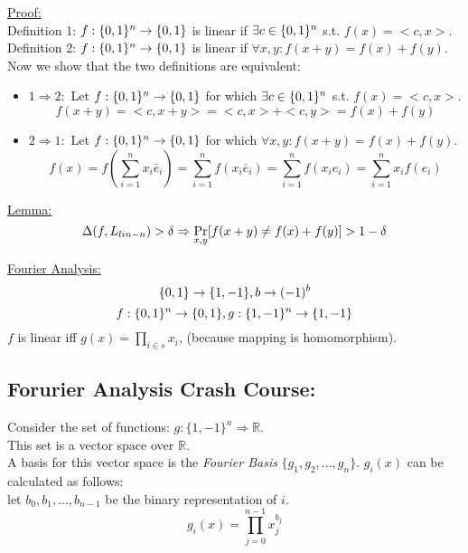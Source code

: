 \underline{Proof:}\\
Definition 1: $f:\{0,1\}^n\rightarrow \{0,1\}$ is
linear if $\exists c\in\{0,1\}^n$ s.t. $f(x)=<c,x>$.\\
Definition 2: $f:\{0,1\}^n\rightarrow \{0,1\}$ is
linear if $\forall x,y: f(x+y)=f(x)+f(y)$.\\
Now we show that the two definitions are equivalent:\\
\begin{itemize}
	\item $1\Rightarrow 2:$
	Let $f:\{0,1\}^n\rightarrow \{0,1\}$ for which  $\exists c\in\{0,1\}^n$ s.t. $f(x)=<c,x>$.\\
	\[
		f(x+y)=<c,x+y>=<c,x>+<c,y>=f(x)+f(y)	
	\]
	\item $2\Rightarrow 1:$
	Let $f:\{0,1\}^n\rightarrow \{0,1\}$ for which $\forall x,y: f(x+y)=f(x)+f(y)$.\\
	\[
		f(x)=f(\sum_{i=1}^n x_i\bar{e}_i)=\sum_{i=1}^n f(x_i\bar{e}_i)
		=\sum_{i=1}^n f(x_ie_i)
		=\sum_{i=1}^nx_if(e_i)%
	\]
\end{itemize}

\underline{Lemma:}\\
\[
	\Delta(f,L_{lin-n})>\delta
	\Rightarrow \operatorname*{Pr}_{x,y}[f(x+y)\neq f(x)+f(y)]>1-\delta
\]

\underline{Fourier Analysis:}\\
\[
	\{0,1\}\rightarrow \{1,-1\}, b\rightarrow (-1)^b
\]\[
	f:\{0,1\}^n\rightarrow \{0,1\}, g:\{1,-1\}^n\rightarrow \{1,-1\}
\]
$f$ is linear iff $g(x)=\prod_{i\in s}x_i$, 
(because mapping is homomorphism).

\subsection*{Forurier Analysis Crash Course:}
Consider the set of functions: $g:\{1,-1\}^n\Rightarrow\mathbb{R}$.\\
This set is a vector space over $\mathbb{R}$.\\
A basis for this vector space is the \emph{Fourier Basis} $\{g_1,g_2,...,g_n\}$.
$g_i(x)$ can be calculated as follows:\\
let $b_0,b_1,...,b_{n-1}$ be the binary representation of $i$.\\
\[
	g_i(x)=\prod_{j=0}^{n-1}x_j^{b_j}
\]
